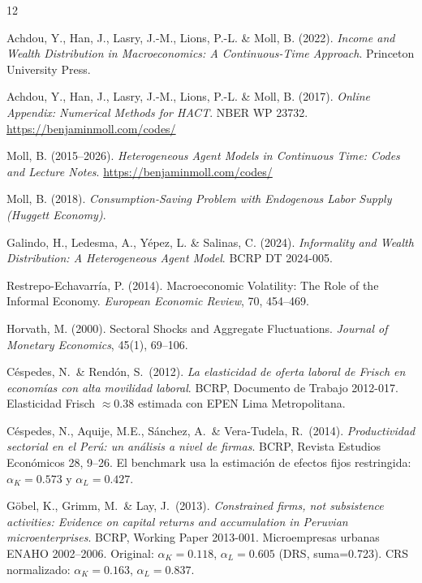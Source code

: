 \documentclass[12pt]{article}
\begin{document}
\begin{thebibliography}{12}

Achdou, Y., Han, J., Lasry, J.-M., Lions, P.-L. \& Moll, B. (2022).
\emph{Income and Wealth Distribution in Macroeconomics: A Continuous-Time Approach}.
Princeton University Press.

Achdou, Y., Han, J., Lasry, J.-M., Lions, P.-L. \& Moll, B. (2017).
\emph{Online Appendix: Numerical Methods for HACT}. NBER WP 23732.
\url{https://benjaminmoll.com/codes/}

Moll, B. (2015--2026).
\emph{Heterogeneous Agent Models in Continuous Time: Codes and Lecture Notes}.
\url{https://benjaminmoll.com/codes/}

Moll, B. (2018).
\emph{Consumption-Saving Problem with Endogenous Labor Supply (Huggett Economy)}.

Galindo, H., Ledesma, A., Yépez, L. \& Salinas, C. (2024).
\emph{Informality and Wealth Distribution: A Heterogeneous Agent Model}. BCRP DT 2024-005.

Restrepo-Echavarría, P. (2014). Macroeconomic Volatility: The Role of the Informal Economy. \emph{European Economic Review}, 70, 454--469.

Horvath, M. (2000). Sectoral Shocks and Aggregate Fluctuations. \emph{Journal of Monetary Economics}, 45(1), 69--106.

Céspedes, N.\ \& Rendón, S.\ (2012).
\emph{La elasticidad de oferta laboral de Frisch en economías con alta movilidad laboral}.
BCRP, Documento de Trabajo 2012-017.
\newblock Elasticidad Frisch $\approx 0.38$ estimada con EPEN Lima Metropolitana.

Céspedes, N., Aquije, M.E., Sánchez, A.\ \& Vera-Tudela, R.\ (2014).
\emph{Productividad sectorial en el Perú: un análisis a nivel de firmas}.
BCRP, Revista Estudios Económicos 28, 9--26.
\newblock El benchmark usa la estimación de efectos fijos restringida: $\alpha_K=0.573$ y $\alpha_L=0.427$.

Göbel, K., Grimm, M.\ \& Lay, J.\ (2013).
\emph{Constrained firms, not subsistence activities: Evidence on capital returns and accumulation in Peruvian microenterprises}.
BCRP, Working Paper 2013-001.
\newblock Microempresas urbanas ENAHO 2002--2006. Original: $\alpha_K=0.118$, $\alpha_L=0.605$ (DRS, suma=0.723). CRS normalizado: $\alpha_K=0.163$, $\alpha_L=0.837$.


\end{thebibliography}
\end{document}

